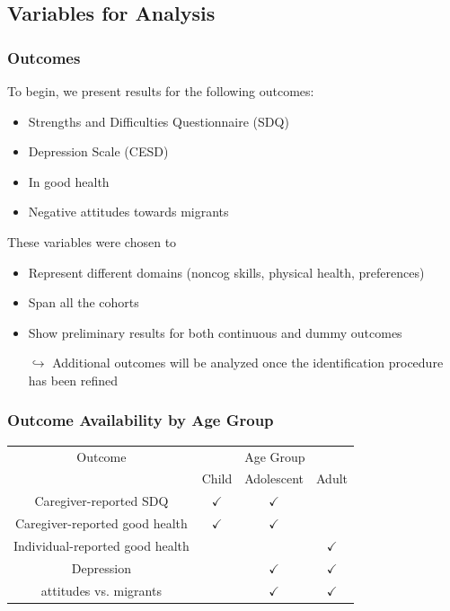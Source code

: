 \documentclass{beamer}
\begin{document}
\subsection{Variables for Analysis}

\begin{frame}
	\frametitle{Outcomes}
	To begin, we present results for the following outcomes:
	\begin{itemize}
		\item Strengths and Difficulties Questionnaire (SDQ) 
		\item Depression Scale (CESD)
		\item In good health
		\item Negative attitudes towards migrants
	\end{itemize}
\vspace{2ex}
\begin{footnotesize}
These variables were chosen to 
\begin{itemize}
 	\item Represent different domains (noncog skills, physical health, preferences)
 	\item Span all the cohorts
 	\item Show preliminary results for both continuous and dummy outcomes
 	\vspace{2ex}
 	\item[$\hookrightarrow$] Additional outcomes will be analyzed once the identification procedure has been refined
\end{itemize}
\end{footnotesize}
\end{frame}


\begin{frame}
	\frametitle{Outcome Availability by Age Group}
	\centering
	\begin{tabular}{cccc}
	\toprule
	Outcome & \multicolumn{3}{c}{Age Group} \\ 
	\cmidrule{2-4}
	& Child & Adolescent & Adult \\
	\midrule
	Caregiver-reported SDQ & $\checkmark$ & $\checkmark$&  \\
	\cmidrule{1-1}
	Caregiver-reported good health & $\checkmark$ & $\checkmark$ &  \\
	Individual-reported good health &  & & $\checkmark$ \\ %
	\cmidrule{1-1}
	Depression &  & $\checkmark$ & $\checkmark$ \\
	\cmidrule{1-1}
	attitudes vs. migrants & & $\checkmark$& $\checkmark$ \\
	\bottomrule
	\end{tabular}
\end{frame}
\end{document}

